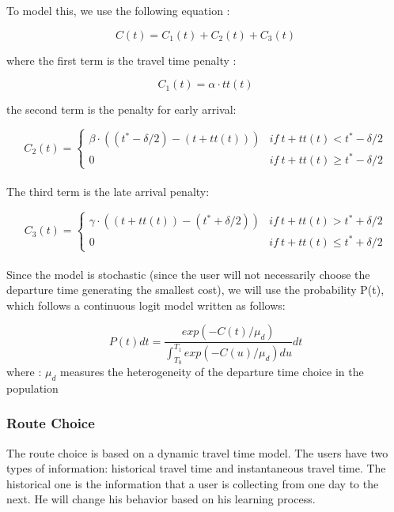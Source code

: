 \documentclass[a4paper, 12pt,oneside]{article}
\begin{document}
To model this, we use the following equation :

\begin{equation}
    C(t)= C_{1}(t) + C_{2}(t) + C_{3}(t)
    \end{equation}

where the first term is the travel time penalty :

\begin{equation}
    C_{1}(t)=\alpha\cdot tt(t)
    \end{equation}

the second term is the penalty for early arrival:

\begin{equation}
C_{2}(t)=
\left\{
\begin{array}{cc}
   \beta \cdot ((t^{*}-\delta/2)-(t+tt(t))) & if \ t + tt(t) < t^{*} - \delta/2  \\
   0 & if \ t + tt(t) \geq t^{*} - \delta/2
\end{array}
\right.
\end{equation}
\\

The third term is the late arrival penalty:

\begin{equation}
C_{3}(t)=
\left\{
\begin{array}{cc}
   \gamma \cdot ((t+tt(t))-(t^{*}+\delta/2)) & if \ t + tt(t) > t^{*} + \delta/2  \\
   0 &  if \  t + tt(t) \leq t^{*} + \delta/2
\end{array}
\right.
\end{equation}
\\

Since the model is stochastic (since the user will not necessarily choose the departure time generating the smallest cost), we will use the probability P(t), which follows a continuous logit model written as follows:

\begin{equation}
    P(t)dt=\frac{exp(-C(t)/\mu_{d})}{\int_{T_{0}}^{T_{1}}exp(-C(u)/\mu_{d})du}dt
    \end{equation}
where :
$\mu_{d}$ measures the heterogeneity of the departure time choice in the population

\subsubsection{Route Choice}

The route choice is based on a dynamic travel time model. The users have two types of information: historical travel time and instantaneous travel time. The historical one is the information that a user is collecting from one day to the next. He will change his behavior based on his learning process.
\end{document}
